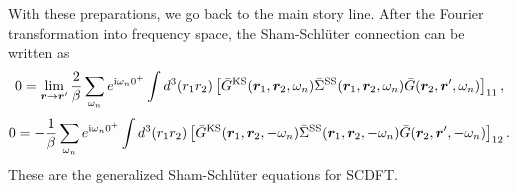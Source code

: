 With these preparations, we go back to the main story line. After the Fourier transformation into frequency space,
the Sham-Schl\"{u}ter connection can be written as
%
\begin{equation}
	0 = \lim_{\bm r \to \bm r'} \frac{2}{\beta} \sum_{\omega_n}
	e^{ {\rm i}\omega_n 0^{+}} 
	\int d^3(r_1 r_2) \left[ \bar{G}^{\rm KS}(\bm r_1, \bm r_2, \omega_n)
	\bar{\Sigma }^{\rm SS}(\bm r_1, \bm r_2, \omega_n) \bar{G}(\bm r_2, \bm r', \omega_n)
	\right]_{11},
	\label{eq:AppSSrho}
\end{equation}
%
\begin{equation}
	0 = - \frac{1}{\beta} \sum_{\omega_n}
	e^{ {\rm i}\omega_n 0^{+}} 
	\int d^3(r_1 r_2) \left[ \bar{G}^{\rm KS}(\bm r_1, \bm r_2, -\omega_n)
	\bar{\Sigma }^{\rm SS}(\bm r_1, \bm r_2, -\omega_n) \bar{G}(\bm r_2, \bm r', -\omega_n)
	\right]_{12}.
	\label{eq:AppSSanom}
\end{equation}
%
These are the generalized Sham-Schl\"{u}ter equations for SCDFT.

